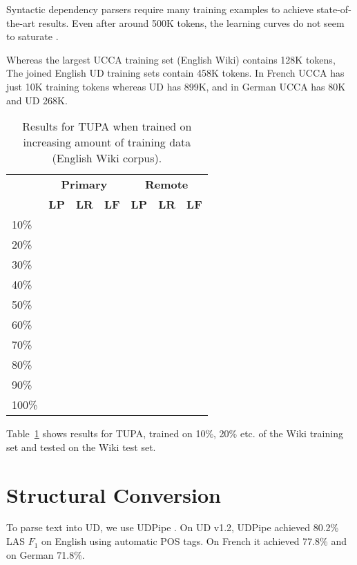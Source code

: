 \documentclass[11pt,a4paper]{article}
\begin{document}
Syntactic dependency parsers require many training examples to achieve
state-of-the-art results.
Even after around 500K tokens, the learning curves do not seem to saturate
\cite{de2017old,velldal2017joint}.

Whereas the largest UCCA training set (English Wiki) contains 128K tokens,
The joined English UD training sets contain 458K tokens.
In French UCCA has just 10K training tokens whereas UD has 899K,
and in German UCCA has 80K and UD 268K.

\begin{table}[t]
\centering
\begin{tabular}{l|lll|lll}
& \multicolumn{3}{c|}{\footnotesize \bf Primary} & \multicolumn{3}{c}{\footnotesize \bf Remote} \\
& \footnotesize \textbf{LP} & \footnotesize \textbf{LR} & \footnotesize \textbf{LF}
& \footnotesize \textbf{LP} & \footnotesize \textbf{LR} & \footnotesize \textbf{LF} \\
\hline
\footnotesize 10\% \\
\footnotesize 20\% \\
\footnotesize 30\% \\
\footnotesize 40\% \\
\footnotesize 50\% \\
\footnotesize 60\% \\
\footnotesize 70\% \\
\footnotesize 80\% \\
\footnotesize 90\% \\
\footnotesize 100\% \\
\end{tabular}
\caption{
Results for TUPA \cite{hershcovich2017a} when trained on increasing amount of training data
(English Wiki corpus).
\label{tab:partial_data_results}}
\end{table}

Table~\ref{tab:partial_data_results} shows results for TUPA,
trained on 10\%, 20\% etc. of the Wiki training set and tested on the Wiki test set.


\section{Structural Conversion}\label{sec:conversion}

To parse text into UD, we use UDPipe \cite{udpipe:2017}.
On UD v1.2, UDPipe achieved 80.2\% LAS $F_1$ on English using automatic POS tags.
On French it achieved 77.8\% and on German 71.8\%.
\end{document}
